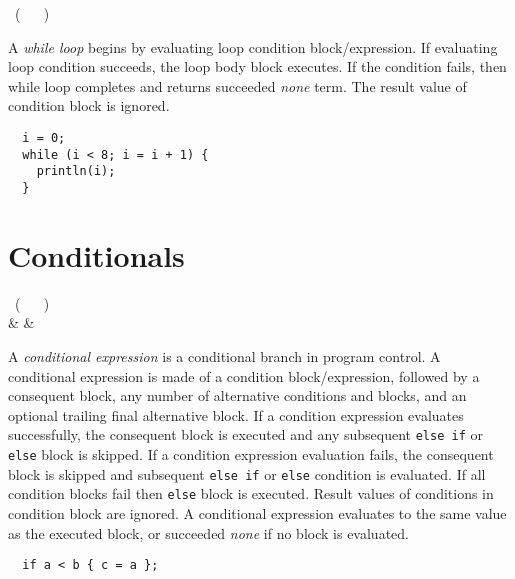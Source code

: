 \begin{bnf}
   \eq {} \ ( \  \gor {} \ ) \ 
\end{bnf}

A \emph{while loop} begins by evaluating loop condition block/expression. If evaluating loop condition succeeds, the loop body block executes. If the condition fails, then while loop completes and returns succeeded \emph{none} term. The result value of condition block is ignored.

\begin{example}
\begin{lstlisting}
  i = 0;
  while (i < 8; i = i + 1) {
    println(i);
  }
\end{lstlisting}
\end{example}

\section{Conditionals}

\begin{bnf}
   \eq {} \ ( \  \gor {} \ ) \  \\
              & & 
\end{bnf}

A \emph{conditional expression} is a conditional branch in program control. A conditional expression is made of a condition block/expression, followed by a consequent block, any number of alternative conditions and blocks, and an optional trailing final alternative block. If a condition expression evaluates successfully, the consequent block is executed and any subsequent \lstinline{else if} or \lstinline{else} block is skipped. If a condition expression evaluation fails, the consequent block is skipped and subsequent \lstinline{else if} or \lstinline{else} condition is evaluated. If all condition blocks fail then \lstinline{else} block is executed. Result values of conditions in condition block are ignored. A conditional expression evaluates to the same value as the executed block, or succeeded \emph{none} if no block is evaluated.

\begin{example}
\begin{lstlisting}
  if a < b { c = a };
\end{lstlisting}
\end{example}


